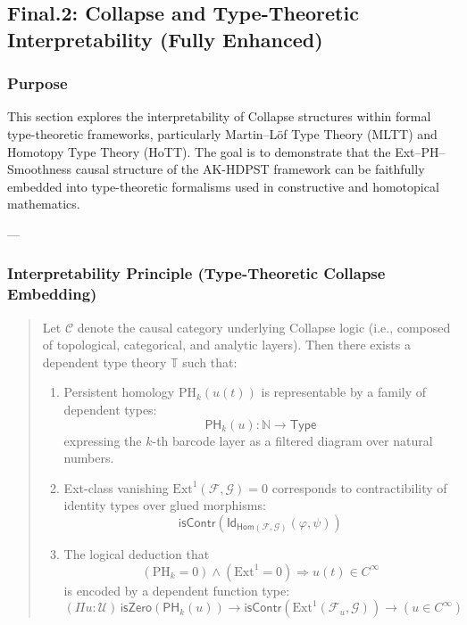 \documentclass[11pt]{article}
\begin{document}
\begin{axiom}
\begin{axiom}
{{\subsection*{Final.2: Collapse and Type-Theoretic Interpretability (Fully Enhanced)}

\subsubsection*{Purpose}

This section explores the interpretability of Collapse structures within formal type-theoretic frameworks,  
particularly Martin–Löf Type Theory (MLTT) and Homotopy Type Theory (HoTT).  
The goal is to demonstrate that the Ext–PH–Smoothness causal structure of the AK-HDPST framework  
can be faithfully embedded into type-theoretic formalisms used in constructive and homotopical mathematics.

---

\subsubsection*{Interpretability Principle (Type-Theoretic Collapse Embedding)}

\begin{quote}
Let \( \mathcal{C} \) denote the causal category underlying Collapse logic  
(i.e., composed of topological, categorical, and analytic layers).  
Then there exists a dependent type theory \( \mathbb{T} \) such that:
\begin{enumerate}
  \item Persistent homology \( \mathrm{PH}_k(u(t)) \) is representable by a family of dependent types:  
  \[
  \mathsf{PH}_k(u) : \mathbb{N} \to \mathsf{Type}
  \]
  expressing the \(k\)-th barcode layer as a filtered diagram over natural numbers.

  \item Ext-class vanishing \( \mathrm{Ext}^1(\mathcal{F}, \mathcal{G}) = 0 \) corresponds to contractibility of identity types over glued morphisms:  
  \[
  \mathsf{isContr}\left( \mathsf{Id}_{\mathsf{Hom}(\mathcal{F}, \mathcal{G})}(\varphi, \psi) \right)
  \]

  \item The logical deduction that  
  \[
  (\mathrm{PH}_k = 0) \wedge (\mathrm{Ext}^1 = 0) \Rightarrow u(t) \in C^\infty
  \]
  is encoded by a dependent function type:
  \[
  (\Pi u : \mathcal{U})\, \mathsf{isZero}(\mathsf{PH}_k(u)) \to \mathsf{isContr}(\mathrm{Ext}^1(\mathcal{F}_u, \mathcal{G})) \to (u \in C^\infty)
  \]
\end{enumerate}
\end{quote}

}}
\end{axiom}
\end{axiom}
\end{document}
